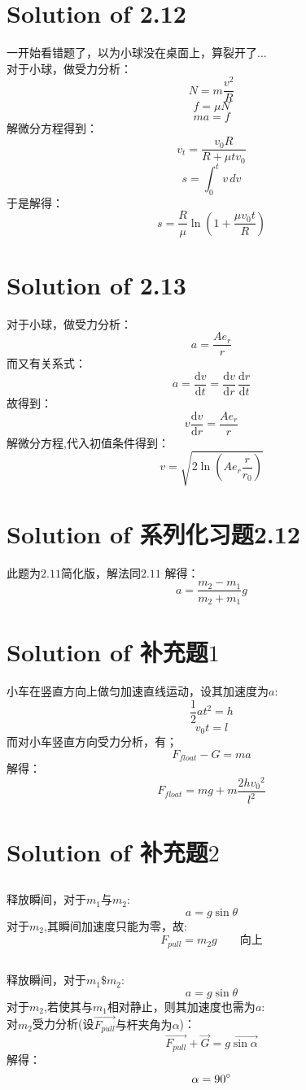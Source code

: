 \documentclass[UTF8]{ctexart}
\begin{document}
\section{Solution of 2.12}
一开始看错题了，以为小球没在桌面上，算裂开了...\\
\hspace{5cm} 对于小球，做受力分析：
        \[N=m\frac{v^2}{R}\]
        \[f=\mu N\]
        \[ma=f\]
\qquad 解微分方程得到：
        \[v_t=\frac{v_0R}{R+\mu tv_0}\]
        \[s=\int_{0}^{t} v\,dv\]
\qquad        于是解得：
        \[s=\frac{R}{\mu}\ln{(1+\frac{\mu v_0t}{R})}\]
\section{Solution of 2.13}
 对于小球，做受力分析：
        \[a=\frac{Ae_r}{r}\]
\qquad 而又有关系式：
        \[a=\frac{\mathrm{d} v}{\mathrm{d} t}=
            \frac{\mathrm{d} v}{\mathrm{d} r}\, \frac{\mathrm{d} r}{\mathrm{d} t}\]
\qquad 故得到：
        \[v\frac{\mathrm{d} v}{\mathrm{d} r}=\frac{Ae_r}{r}\]
\qquad 解微分方程,代入初值条件得到：
        \[v=\sqrt{2\ln(Ae_r\frac{r}{r_0})}\]
\section{Solution of 系列化习题2.12}
此题为$2.11$简化版，解法同$2.11$
\qquad    解得：
        \[a=\frac{m_2-m_1}{m_2+m_1}g\]
\section{Solution of 补充题$1$}
小车在竖直方向上做匀加速直线运动，设其加速度为$a$:
        \[\frac{1}{2}at^2=h\]
        \[v_0t=l\]
\qquad 而对小车竖直方向受力分析，有；
        \[F_{float}-G=ma\]
\qquad 解得：      
        \[F_{float}=mg+m\frac{2h{v_0}^2}{l^2}\]
\section{Solution of 补充题$2$}
\subsection{}
释放瞬间，对于$m_1 \mbox{与} m_2$:
        \[a=g\sin{\theta}\]
\qquad  对于$m_2$,其瞬间加速度只能为零，故:
        \[F_{pull}=m_2g \qquad \mbox{向上}\]
\subsection{}
释放瞬间，对于$m_1\$m_2$:
        \[a=g\sin{\theta}\]
\qquad  对于$m_2$,若使其与$m_1$相对静止，则其加速度也需为$a$:\\
\qquad  对$m_2$受力分析(设$\vec{F_{pull}}\mbox{与杆夹角为}\alpha$)：
        \[\vec{F_{pull}}+\vec{G}=\vec{g\sin{\alpha}}\]
\qquad   解得：
        \[\alpha=90^\circ\]
\end{document}

